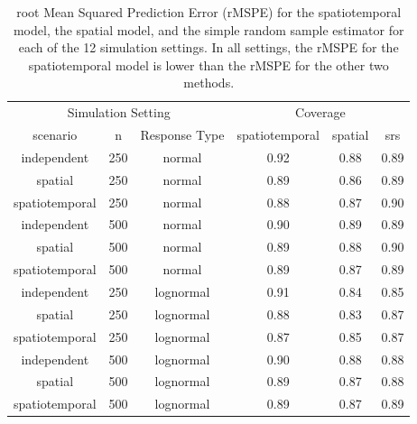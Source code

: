 \documentclass[]{interact}
\theoremstyle{plain}%
\theoremstyle{definition}
\theoremstyle{remark}
\begin{document}
\begin{table}[H]

\caption{\label{tab:simpitab}root Mean Squared Prediction Error (rMSPE) for the spatiotemporal model, the spatial model, and the simple random sample estimator for each of the 12 simulation settings. In all settings, the rMSPE for the spatiotemporal model is lower than the rMSPE for the other two methods.}
\centering
\begin{tabular}[t]{cccccc}
\toprule
\multicolumn{3}{c}{Simulation Setting} & \multicolumn{3}{c}{Coverage} \\
\cmidrule(l{3pt}r{3pt}){1-3} \cmidrule(l{3pt}r{3pt}){4-6}
scenario & n & Response Type & spatiotemporal & spatial & srs\\
\midrule
independent & 250 & normal & 0.92 & 0.88 & 0.89\\
spatial & 250 & normal & 0.89 & 0.86 & 0.89\\
spatiotemporal & 250 & normal & 0.88 & 0.87 & 0.90\\
\midrule
independent & 500 & normal & 0.90 & 0.89 & 0.89\\
spatial & 500 & normal & 0.89 & 0.88 & 0.90\\
spatiotemporal & 500 & normal & 0.89 & 0.87 & 0.89\\
\midrule
independent & 250 & lognormal & 0.91 & 0.84 & 0.85\\
spatial & 250 & lognormal & 0.88 & 0.83 & 0.87\\
spatiotemporal & 250 & lognormal & 0.87 & 0.85 & 0.87\\
\midrule
independent & 500 & lognormal & 0.90 & 0.88 & 0.88\\
spatial & 500 & lognormal & 0.89 & 0.87 & 0.88\\
spatiotemporal & 500 & lognormal & 0.89 & 0.87 & 0.89\\
\bottomrule
\end{tabular}
\end{table}



\end{document}
